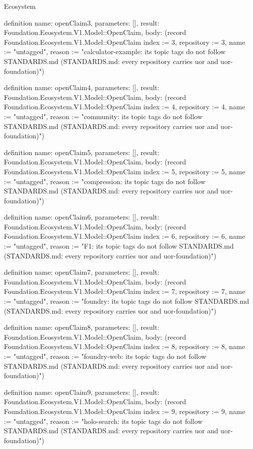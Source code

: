 \begin{lexlean}{Ecosystem}
\begin{semanticmodule}
definition{
  name: openClaim3,
  parameters: [],
  result: Foundation.Ecosystem.V1.Model::OpenClaim,
  body: (record Foundation.Ecosystem.V1.Model::OpenClaim {index := 3, repository := 3, name := "untagged", reason := "calculator-example: its topic tags do not follow STANDARDS.md (STANDARDS.md: every repository carries uor and uor-foundation)"})
}

definition{
  name: openClaim4,
  parameters: [],
  result: Foundation.Ecosystem.V1.Model::OpenClaim,
  body: (record Foundation.Ecosystem.V1.Model::OpenClaim {index := 4, repository := 4, name := "untagged", reason := "community: its topic tags do not follow STANDARDS.md (STANDARDS.md: every repository carries uor and uor-foundation)"})
}

definition{
  name: openClaim5,
  parameters: [],
  result: Foundation.Ecosystem.V1.Model::OpenClaim,
  body: (record Foundation.Ecosystem.V1.Model::OpenClaim {index := 5, repository := 5, name := "untagged", reason := "compression: its topic tags do not follow STANDARDS.md (STANDARDS.md: every repository carries uor and uor-foundation)"})
}

definition{
  name: openClaim6,
  parameters: [],
  result: Foundation.Ecosystem.V1.Model::OpenClaim,
  body: (record Foundation.Ecosystem.V1.Model::OpenClaim {index := 6, repository := 6, name := "untagged", reason := "F1: its topic tags do not follow STANDARDS.md (STANDARDS.md: every repository carries uor and uor-foundation)"})
}

definition{
  name: openClaim7,
  parameters: [],
  result: Foundation.Ecosystem.V1.Model::OpenClaim,
  body: (record Foundation.Ecosystem.V1.Model::OpenClaim {index := 7, repository := 7, name := "untagged", reason := "foundry: its topic tags do not follow STANDARDS.md (STANDARDS.md: every repository carries uor and uor-foundation)"})
}

definition{
  name: openClaim8,
  parameters: [],
  result: Foundation.Ecosystem.V1.Model::OpenClaim,
  body: (record Foundation.Ecosystem.V1.Model::OpenClaim {index := 8, repository := 8, name := "untagged", reason := "foundry-web: its topic tags do not follow STANDARDS.md (STANDARDS.md: every repository carries uor and uor-foundation)"})
}

definition{
  name: openClaim9,
  parameters: [],
  result: Foundation.Ecosystem.V1.Model::OpenClaim,
  body: (record Foundation.Ecosystem.V1.Model::OpenClaim {index := 9, repository := 9, name := "untagged", reason := "holo-search: its topic tags do not follow STANDARDS.md (STANDARDS.md: every repository carries uor and uor-foundation)"})
}


\end{semanticmodule}
\end{lexlean}
